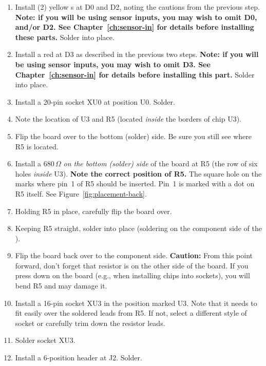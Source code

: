 \documentclass[letterpaper,twoside,onecolumn,openright,final]{memoir}
\begin{document}
\begin{enumerate}
	{\bfseries Note: These must be inserted in the 
	correct orientation.} The longer lead (anode) goes into the 
	square hole, while the shorter
	lead (cathode) goes into the round hole.  Solder into place.
\item	Install (2) yellow s at D0 and D2, noting the 
	cautions from the previous step.
	{\bfseries Note: if you will be using sensor inputs, you may
	wish to omit D0, and/or D2.  See Chapter~\ref{ch:sensor-in} for 
	details before installing these parts.}
	Solder into place.
\item	Install a red  at D3 as described in the previous
	two steps.  
	{\bfseries Note: if you will be using sensor inputs, you may
	wish to omit D3.  See Chapter~\ref{ch:sensor-in} for 
	details before installing this part.}
	Solder into place.
\item	Install a 20-pin  socket XU0 at position U0. Solder.
\item	Note the location of U3 and R5 (located \emph{inside} the borders 
	of chip U3).
\item	Flip the board over to the bottom (solder) side.  Be sure you still see where R5 is
	located.
\item
	Install a 680\,$\Omega$  
	\emph{on the bottom (solder) side} of the board at
	R5 (the row of six holes \emph{inside} U3).  {\bfseries Note the correct position of R5.} The
	square hole on the  marks where pin~1 of R5 should be inserted.  Pin~1 is marked
	with a dot on R5 itself. See Figure~\ref{fig:placement-back}.
\item	Holding R5 in place, carefully flip the board over.
\item
	Keeping R5 straight, solder into place (soldering on the component side of the ).
\item	Flip the board back over to the component side.  {\bfseries Caution:} From this point 
	forward, don't forget that resistor is on the other side of the board.  If you press down
	on the board (e.g., when installing chips into sockets), you will bend R5 and may
	damage it.
\item	Install a 16-pin  socket XU3 in the position marked U3.  
	Note that it needs to fit easily
	over the soldered leads from R5.  If not, select a different style of socket or
	carefully trim down the resistor leads.
\item	Solder socket XU3.
\item	Install a 6-position  header at J2.  Solder.

\end{enumerate}
\end{document}
